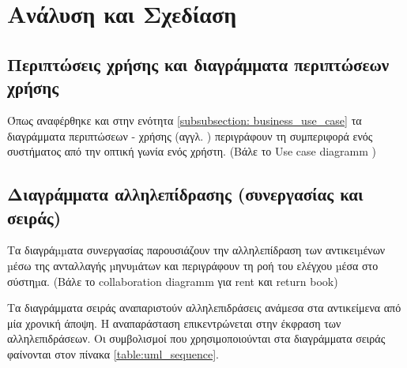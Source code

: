 \documentclass{assignment}
\begin{document}
\section{Ανάλυση και Σχεδίαση}

\subsection{Περιπτώσεις χρήσης και διαγράμματα περιπτώσεων χρήσης}

Όπως αναφέρθηκε και στην ενότητα \ref{subsubsection: business_use_case} τα διαγράμματα περιπτώσεων - χρήσης (αγγλ. ) περιγράφουν τη συμπεριφορά ενός συστήματος από την οπτική γωνία ενός χρήστη. (Βάλε το Use case diagramm )

\subsection{Διαγράμματα αλληλεπίδρασης (συνεργασίας και σειράς)}

Τα διαγράµµατα συνεργασίας παρουσιάζουν την αλληλεπίδραση των αντικειµένων µέσω της ανταλλαγής µηνυµάτων και περιγράφουν τη ροή του ελέγχου µέσα στο σύστηµα.
(Βάλε το collaboration diagramm για rent και return book)

Τα διαγράμματα σειράς αναπαριστούν αλληλεπιδράσεις ανάμεσα στα αντικείμενα από μία χρονική άποψη. Η αναπαράσταση επικεντρώνεται στην έκφραση των αλληλεπιδράσεων. Οι συμβολισμοί που χρησιμοποιούνται στα διαγράμματα σειράς φαίνονται στον πίνακα \ref{table:uml_sequence}.
\end{document}
